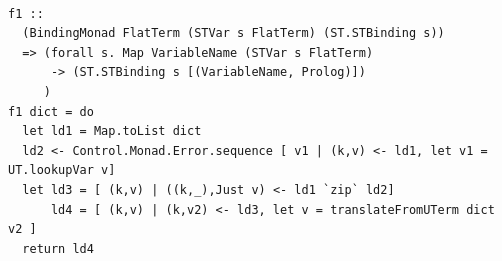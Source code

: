 \documentclass[thesis-solanki.tex]{subfiles}
\begin{document}
\begin{verbatim}

f1 ::
  (BindingMonad FlatTerm (STVar s FlatTerm) (ST.STBinding s))
  => (forall s. Map VariableName (STVar s FlatTerm)
      -> (ST.STBinding s [(VariableName, Prolog)])
     )
f1 dict = do
  let ld1 = Map.toList dict
  ld2 <- Control.Monad.Error.sequence [ v1 | (k,v) <- ld1, let v1 = UT.lookupVar v]
  let ld3 = [ (k,v) | ((k,_),Just v) <- ld1 `zip` ld2]
      ld4 = [ (k,v) | (k,v2) <- ld3, let v = translateFromUTerm dict v2 ]
  return ld4
\end{verbatim}

\end{document}
